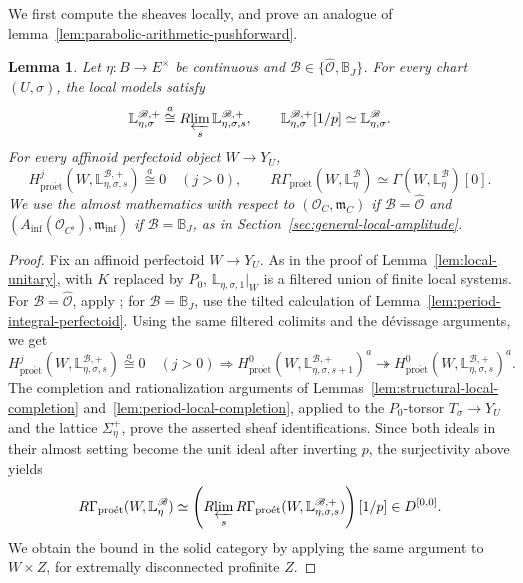 \documentclass[11pt]{article}
\newtheorem{lemma}[theorem]{Lemma}
\theoremstyle{definition}
\newcommand{\cO}{\mathcal O}
\newcommand{\proet}{\mathrm{pro\acute et}}
\newcommand{\acong}{\mathrel{\overset{a}{\cong}}}
\begin{document}
We first compute the sheaves locally, and prove an 
analogue of lemma~\ref{lem:parabolic-arithmetic-pushforward}.
\begin{lemma}%
\label{lem:parabolic-geometric-perfectoid}
Let \(\eta:B\to E^\times\) be continuous and
\(\mathscr B\in\{\widehat{\mathscr O},\mathbb B_J\}\).
For every chart \((U,\sigma)\), the local models satisfy
\begin{equation*}
 \mathbb L_{\eta,\sigma}^{\mathscr B,+}
 \acong R\!\varprojlim_s
          \mathbb L_{\eta,\sigma,s}^{\mathscr B,+},
 \qquad
 \mathbb L_{\eta,\sigma}^{\mathscr B,+}[1/p]
 \simeq\mathbb L_{\eta,\sigma}^{\mathscr B}.
\end{equation*}
For every affinoid perfectoid object \(W\to Y_U\),
\begin{equation*}
 H^j_{\proet}(W,\mathbb L_{\eta,\sigma,s}^{\mathscr B,+})\acong0
 \quad(j>0),\qquad
 R\Gamma_{\proet}(W,\mathbb L_\eta^{\mathscr B})
 \simeq\Gamma(W,\mathbb L_\eta^{\mathscr B})[0].
\end{equation*}
We use the almost mathematics with respect to \((\cO_C,\mathfrak m_C)\) if
\(\mathscr{B}=\widehat{\mathscr O}\) and
\((A_{\inf}(\cO_{C^\flat}),\mathfrak m_{\inf})\) if
\(\mathscr{B}=\mathbb B_J\), as in Section~\ref{sec:general-local-amplitude}.
\end{lemma}
\begin{proof}
Fix an affinoid perfectoid \(W\to Y_U\).  As in the proof of
Lemma~\ref{lem:local-unitary}, with \(K\) replaced by \(P_0\),
\(\mathbb L_{\eta,\sigma,1}|_W\) is a filtered union of finite
local systems.  For $\mathscr{B}=\widehat{\mathscr{O}}$, apply
\cite[Lemma~4.12]{ScholzeRigid}; for $\mathscr{B}=\mathbb{B}_J$, use
the tilted calculation of Lemma~\ref{lem:period-integral-perfectoid}.
Using the same filtered colimits and the d\'evissage arguments, we get
\[
 H^j_{\proet}(W,\mathbb L_{\eta,\sigma,s}^{\mathscr B,+})\acong0
 \quad(j>0)\Rightarrow
 H^0_{\proet}(W,\mathbb L_{\eta,\sigma,s+1}^{\mathscr B,+})^a
 \twoheadrightarrow
 H^0_{\proet}(W,\mathbb L_{\eta,\sigma,s}^{\mathscr B,+})^a.
\]
The completion and rationalization arguments of
Lemmas~\ref{lem:structural-local-completion}
and~\ref{lem:period-local-completion}, applied to the
\(P_0\)-torsor \(T_\sigma\to Y_U\) and the lattice
\(\Sigma_\eta^+\), prove the asserted sheaf identifications.
Since both ideals in their almost setting become the unit ideal after inverting
\(p\), the surjectivity above yields
\begin{equation*}
 R\Gamma_{\proet}(W,\mathbb L_\eta^{\mathscr B})
 \simeq
 \left(R\!\varprojlim_s R\Gamma_{\proet}
      (W,\mathbb L_{\eta,\sigma,s}^{\mathscr B,+})\right)[1/p]
 \in D^{[0,0]}.
\end{equation*}
We obtain the bound in the solid category by applying the same argument
to \(W\times Z\), for extremally disconnected profinite \(Z\).
\end{proof}
\end{document}
